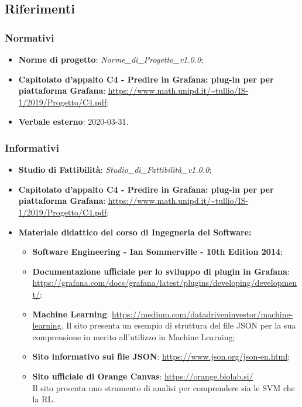 \subsection{Riferimenti}
		\subsubsection{Normativi}
			\begin{itemize}
				\item \textbf{Norme di progetto}: \emph{Norme\_di\_Progetto\_v1.0.0};
				\item \textbf{Capitolato d'appalto C4 - Predire in Grafana: plug-in per per piattaforma Grafana}: \url{https://www.math.unipd.it/~tullio/IS-1/2019/Progetto/C4.pdf};
				\item \textbf{Verbale esterno}: 2020-03-31. 
			\end{itemize}
		
		\subsubsection{Informativi}
			\begin{itemize}
				\item \textbf{Studio di Fattibilità}: \emph{Studio\_di\_Fattibilità\_v1.0.0};
				\item \textbf{Capitolato d'appalto C4 - Predire in Grafana: plug-in per per piattaforma Grafana}: \url{https://www.math.unipd.it/~tullio/IS-1/2019/Progetto/C4.pdf};
				\item \textbf{Materiale didattico del corso di Ingegneria del Software:}
				\begin{itemize}
					\item \textbf{Software Engineering - Ian Sommerville - 10th Edition 2014};
					\item \textbf{Documentazione ufficiale per lo sviluppo di plugin in Grafana}: \url{https://grafana.com/docs/grafana/latest/plugins/developing/development/};
					\item \textbf{Machine Learning}: \href{https://medium.com/datadriveninvestor/machine-learning-how-to-save-and-load-scikit-learn-models-d7b99bc32c27}{https://medium.com/datadriveninvestor/machine-learning}. Il sito presenta un esempio di struttura del file JSON per la sua comprensione in merito all'utilizzo in Machine Learning;
					\item \textbf{Sito informativo sui file JSON}: \url{https://www.json.org/json-en.html};
					\item \textbf{Sito ufficiale di Orange Canvas}: \url{https://orange.biolab.si/} \\ Il sito presenta uno strumento di analisi per comprendere sia le SVM che la RL. 
				\end{itemize}
			\end{itemize}				